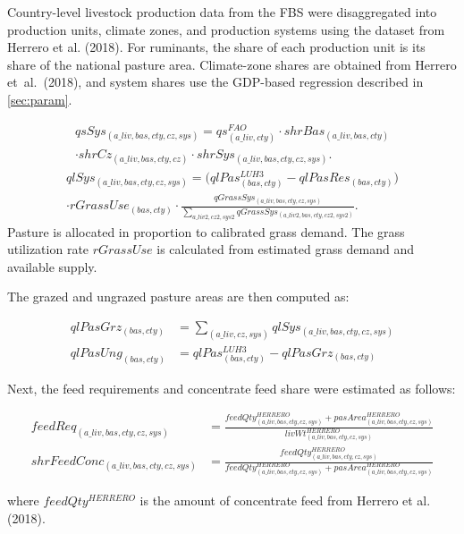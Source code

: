 Country-level livestock production data from the FBS were disaggregated 
into production units, climate zones, and production systems 
using the dataset from Herrero et al. (2018). 
For ruminants, the share of each production unit is its share of the national pasture area. 
Climate-zone shares are obtained from Herrero et~al.~(2018), and system shares use the GDP-based regression described in \cref{sec:param}.

\begin{multline}
qsSys_{(a\_liv,bas,cty,cz,sys)}
= qs^{FAO}_{(a\_liv,cty)}\cdot shrBas_{(a\_liv,bas,cty)}
\\[-0.3em]
\cdot shrCz_{(a\_liv,bas,cty,cz)}\cdot shrSys_{(a\_liv,bas,cty,cz,sys)}.
\end{multline}
\begin{multline}
qlSys_{(a\_liv,bas,cty,cz,sys)}
=\bigl(qlPas^{LUH3}_{(bas,cty)}-qlPasRes_{(bas,cty)}\bigr)
\\[-0.3em]
\cdot rGrassUse_{(bas,cty)}
\cdot\frac{qGrassSys_{(a\_liv,bas,cty,cz,sys)}}
{\sum_{a\_liv2,cz2,sys2}qGrassSys_{(a\_liv2,bas,cty,cz2,sys2)}}.
\end{multline}
Pasture is allocated in proportion to calibrated grass demand. The grass utilization rate \(rGrassUse\) is calculated from estimated grass demand and available supply.

The grazed and ungrazed pasture areas are then computed as:

\begin{align}
qlPasGrz_{(bas,cty)} &= \sum_{(a\_liv,cz,sys)} qlSys_{(a\_liv,bas,cty,cz,sys)} \\
qlPasUng_{(bas,cty)} &= qlPas^{LUH3}_{(bas,cty)} - qlPasGrz_{(bas,cty)}
\end{align}

Next, the feed requirements and concentrate feed share were estimated as follows:

\begin{align}
feedReq_{(a\_liv,bas,cty,cz,sys)} &=
\frac{feedQty^{HERRERO}_{(a\_liv,bas,cty,cz,sys)} + pasArea^{HERRERO}_{(a\_liv,bas,cty,cz,sys)}}
{livWt^{HERRERO}_{(a\_liv,bas,cty,cz,sys)}} \\
shrFeedConc_{(a\_liv,bas,cty,cz,sys)} &=
\frac{feedQty^{HERRERO}_{(a\_liv,bas,cty,cz,sys)}}
{feedQty^{HERRERO}_{(a\_liv,bas,cty,cz,sys)} + pasArea^{HERRERO}_{(a\_liv,bas,cty,cz,sys)}}
\end{align}

where \( feedQty^{HERRERO} \) is the amount of concentrate feed from Herrero et al. (2018).

